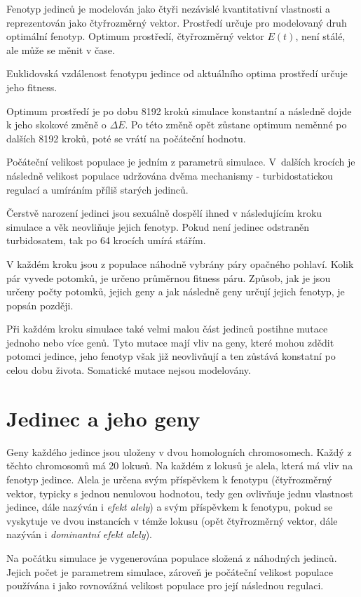 Fenotyp jedinců je modelován jako čtyři nezávislé kvantitativní vlastnosti a reprezentován jako čtyřrozměrný vektor.
Prostředí určuje pro modelovaný druh optimální fenotyp. Optimum prostředí, čtyřrozměrný vektor $E(t)$, není stálé,
ale může se měnit v čase.

Euklidovská vzdálenost fenotypu jedince od aktuálního optima prostředí určuje jeho fitness.

Optimum prostředí je po dobu 8192 kroků simulace konstantní a následně dojde k jeho skokové změně o
$\Delta{}E$. Po této změně opět zůstane optimum neměnné po dalších 8192 kroků, poté se vrátí na počáteční hodnotu.

Počáteční velikost populace je jedním z parametrů simulace.  V~dalších krocích je následně velikost populace
udržována dvěma mechanismy - turbidostatickou regulací a umíráním příliš starých jedinců.

Čerstvě narození jedinci jsou sexuálně dospělí ihned v následujícím kroku simulace a věk neovliňuje jejich fenotyp.
Pokud není jedinec odstraněn turbidosatem, tak po 64 krocích umírá stářím.

V každém kroku jsou z populace náhodně vybrány páry opačného pohlaví.
Kolik pár vyvede potomků, je určeno průměrnou fitness páru. Způsob, jak je jsou určeny počty potomků, jejich geny a
jak následně geny určují jejich fenotyp, je popsán později.

Při každém kroku simulace také velmi malou část jedinců postihne mutace jednoho nebo více genů. Tyto mutace mají
vliv na geny, které mohou zdědit potomci jedince, jeho fenotyp však již neovlivňují a ten zůstává konstatní po celou
dobu života. Somatické mutace nejsou modelovány.

\section{Jedinec a jeho geny}

Geny každého jedince jsou uloženy v dvou homologních chromosomech. Každý z těchto chromosomů má 20 lokusů.
Na každém z lokusů je alela, která má vliv na fenotyp jedince. Alela je určena svým příspěvkem k fenotypu (čtyřrozměrný
vektor, typicky s jednou nenulovou hodnotou, tedy gen ovlivňuje jednu vlastnost jedince, dále nazýván i
\textit{efekt alely}) a svým příspěvkem k fenotypu, pokud se vyskytuje ve dvou instancích v témže lokusu
(opět čtyřrozměrný vektor, dále nazýván i \textit{dominantní efekt alely}).

Na počátku simulace je vygenerována populace složená z náhodných jedinců.
Jejich počet je parametrem simulace, zároveň je počáteční velikost populace používána i jako rovnovážná velikost
populace pro její následnou regulaci.


